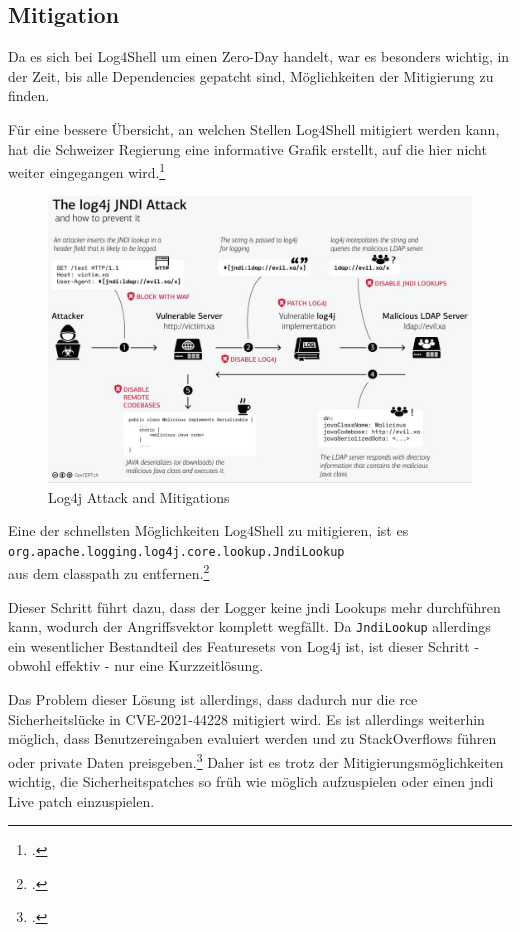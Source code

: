 
\clearpage
\subsection{Mitigation}\label{subsec:mitigation}
Da es sich bei Log4Shell um einen Zero-Day handelt, war es besonders wichtig, in der Zeit, bis alle Dependencies gepatcht sind, Möglichkeiten der Mitigierung zu finden.

Für eine bessere Übersicht, an welchen Stellen Log4Shell mitigiert werden kann, hat die Schweizer Regierung eine informative Grafik erstellt, auf die hier nicht weiter eingegangen wird.\footcite{schweizGov}

\begin{figure}[!htb]\label{fig:log4jattackgraphic}
    \begin{center}
        \includegraphics[width=\textwidth]{images/log4j_attack}
    \end{center}
    \caption{Log4j Attack and Mitigations}
\end{figure}

Eine der schnellsten Möglichkeiten Log4Shell zu mitigieren, ist es
\\ \verb|org.apache.logging.log4j.core.lookup.JndiLookup|\\
aus dem classpath zu entfernen.\footcite{redditThread}

Dieser Schritt führt dazu, dass der Logger keine \gls{jndi} Lookups mehr durchführen kann, wodurch der Angriffsvektor komplett wegfällt.
Da \verb|JndiLookup| allerdings ein wesentlicher Bestandteil des Featuresets von Log4j ist, ist dieser Schritt - obwohl effektiv - nur eine Kurzzeitlösung.

Das Problem dieser Lösung ist allerdings, dass dadurch nur die \gls{rce} Sicherheitslücke in CVE-2021-44228 mitigiert wird.
Es ist allerdings weiterhin möglich, dass Benutzereingaben evaluiert werden und zu StackOverflows führen oder private Daten preisgeben.\footcite{log4jSecurity}
Daher ist es trotz der Mitigierungsmöglichkeiten wichtig, die Sicherheitspatches so früh wie möglich aufzuspielen oder einen \gls{jndi} Live patch einzuspielen.
